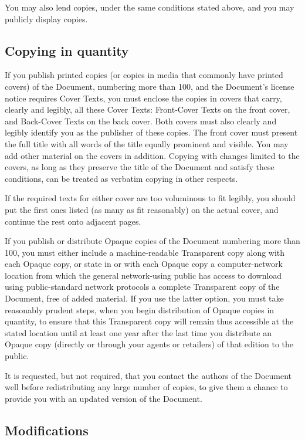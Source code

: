 You may also lend copies, under the same conditions stated above,
and you may publicly display copies.

\subsection{Copying in quantity\label{subsec:3Copying-in-quantity}}

If you publish printed copies (or copies in media that commonly have
printed covers) of the Document, numbering more than 100, and the
Document's license notice requires Cover Texts, you must enclose the
copies in covers that carry, clearly and legibly, all these Cover
Texts: Front-Cover Texts on the front cover, and Back-Cover Texts
on the back cover. Both covers must also clearly and legibly identify
you as the publisher of these copies. The front cover must present
the full title with all words of the title equally prominent and visible.
You may add other material on the covers in addition. Copying with
changes limited to the covers, as long as they preserve the title
of the Document and satisfy these conditions, can be treated as verbatim
copying in other respects.

If the required texts for either cover are too voluminous to fit legibly,
you should put the first ones listed (as many as fit reasonably) on
the actual cover, and continue the rest onto adjacent pages.

If you publish or distribute Opaque copies of the Document numbering
more than 100, you must either include a mach\-ine-read\-able Transparent
copy along with each Opaque copy, or state in or with each Opaque
copy a com\-put\-er-net\-work location from which the general net\-work-using
public has access to download using public-standard network protocols
a complete Transparent copy of the Document, free of added material.
If you use the latter option, you must take reasonably prudent steps,
when you begin distribution of Opaque copies in quantity, to ensure
that this Transparent copy will remain thus accessible at the stated
location until at least one year after the last time you distribute
an Opaque copy (directly or through your agents or retailers) of that
edition to the public.

It is requested, but not required, that you contact the authors of
the Document well before redistributing any large number of copies,
to give them a chance to provide you with an updated version of the
Document.

\subsection{Modifications\label{subsec:4Modifications}}


